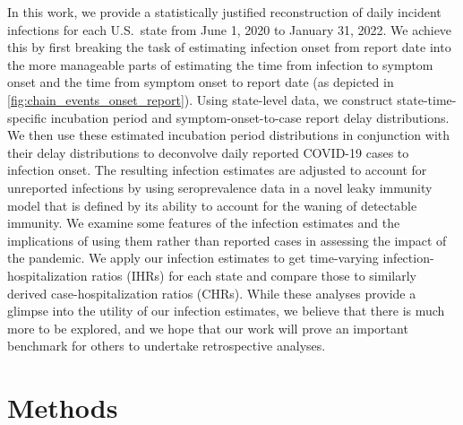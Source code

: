 \documentclass{article}
\begin{document}
In this work, we provide a statistically justified reconstruction of
daily incident infections for each U.S.\ state from June 1, 2020 to January 31,
2022. We achieve this by first breaking the task of estimating infection onset
from report date into the more manageable parts of estimating the time from
infection to symptom onset and the time from symptom onset to report date (as
depicted in \autoref{fig:chain_events_onset_report}). Using state-level data, we
construct state-time-specific incubation period and
symptom-onset-to-case report delay distributions. We then use these estimated
incubation period distributions in conjunction with their delay distributions to
deconvolve daily reported COVID-19 cases to infection onset. The resulting
infection estimates are adjusted to account for unreported infections by
using seroprevalence data in a novel leaky immunity model that is defined by its
ability to account for the waning of detectable immunity.  
We examine some features of the infection estimates and the implications of
using them rather than reported cases in assessing the impact of the pandemic.
We apply our infection estimates to get time-varying infection-hospitalization
ratios (IHRs) for each state and compare those to similarly derived
case-hospitalization ratios (CHRs).
While these analyses provide a glimpse into the utility of our
infection estimates, we believe that there is much more to be explored, and we hope that
our work will prove an important benchmark for others to undertake retrospective
analyses.

\section{Methods}
\end{document}
